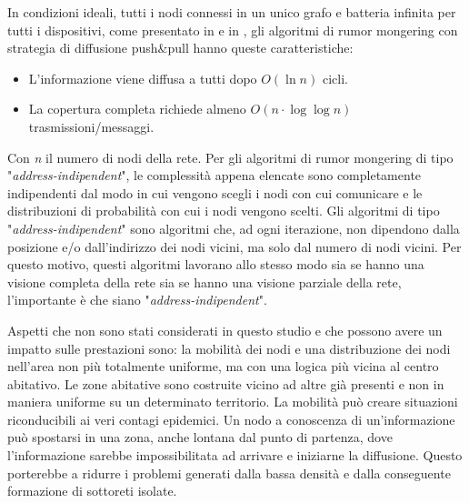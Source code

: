 In condizioni ideali, tutti i nodi connessi in un unico grafo e batteria infinita per tutti i dispositivi, come presentato in \cite{gossip2000-comp} e in \cite{schindel2004-epidemicAlg}, gli algoritmi di rumor mongering con strategia di diffusione push\&pull hanno queste caratteristiche:
\begin{itemize}
	\item L'informazione viene diffusa a tutti dopo $ O\left( \ln \mathit{n} \right)  $ cicli.
	\item La copertura completa richiede almeno $ O\left( \mathit{n}\cdot\log \log \mathit{n} \right)  $ trasmissioni/messaggi.
\end{itemize}
Con \textit{n} il numero di nodi della rete. Per gli algoritmi di rumor mongering di tipo "\textit{address-indipendent}", le complessità appena elencate sono completamente indipendenti dal modo in cui vengono scegli i nodi con cui comunicare e le distribuzioni di probabilità con cui i nodi vengono scelti. Gli algoritmi di tipo "\textit{address-indipendent}" sono algoritmi che, ad ogni iterazione, non dipendono dalla posizione e/o dall'indirizzo dei nodi vicini, ma solo dal numero di nodi vicini. Per questo motivo, questi algoritmi lavorano allo stesso modo sia se hanno una visione completa della rete sia se hanno una visione parziale della rete, l'importante è che siano "\textit{address-indipendent}".

Aspetti che non sono stati considerati in questo studio e che possono avere un impatto sulle prestazioni sono: la mobilità dei nodi e una distribuzione dei nodi nell'area non più totalmente uniforme, ma con una logica più vicina al centro abitativo. Le zone abitative sono costruite vicino ad altre già presenti e non in maniera uniforme su un determinato territorio. La mobilità può creare situazioni riconducibili ai veri contagi epidemici. Un nodo a conoscenza di un'informazione può spostarsi in una zona, anche lontana dal punto di partenza, dove l'informazione sarebbe impossibilitata ad arrivare e iniziarne la diffusione. Questo porterebbe a ridurre i problemi generati dalla bassa densità e dalla conseguente formazione di sottoreti isolate.